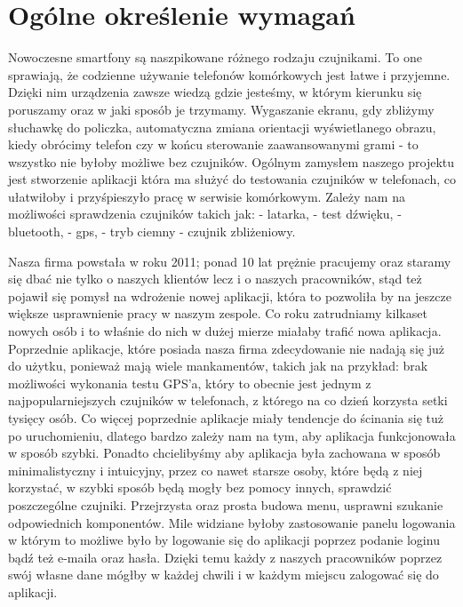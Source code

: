 \section{Ogólne określenie wymagań}		%

\hspace{0.60cm}Nowoczesne smartfony są naszpikowane różnego rodzaju czujnikami. To one sprawiają, że codzienne używanie telefonów komórkowych jest łatwe i przyjemne. Dzięki nim urządzenia zawsze wiedzą gdzie jesteśmy, w którym kierunku się poruszamy oraz w jaki sposób je trzymamy. Wygaszanie ekranu, gdy zbliżymy słuchawkę do policzka, automatyczna zmiana orientacji wyświetlanego obrazu, kiedy obrócimy telefon czy w końcu sterowanie zaawansowanymi grami - to wszystko nie byłoby możliwe bez czujników. Ogólnym zamysłem naszego projektu jest stworzenie aplikacji która ma służyć do testowania czujników w telefonach, co ułatwiłoby i przyśpieszyło pracę w serwisie komórkowym. Zależy nam na możliwości sprawdzenia czujników takich jak: 
- latarka, \newline 
- test dźwięku, \newline
- bluetooth, \newline
- gps, \newline
- tryb ciemny \newline
- czujnik zbliżeniowy.\newline

Nasza firma powstała w roku 2011; ponad 10 lat prężnie pracujemy oraz staramy się dbać nie tylko o naszych klientów lecz i o naszych pracowników, stąd też pojawił się pomysł na wdrożenie nowej aplikacji, która to pozwoliła by na jeszcze większe usprawnienie pracy w naszym zespole. Co roku zatrudniamy kilkaset nowych osób i to właśnie do nich w dużej mierze miałaby trafić nowa aplikacja. Poprzednie aplikacje, które posiada nasza firma zdecydowanie nie nadają się już do użytku, ponieważ mają wiele mankamentów, takich jak na przykład: brak możliwości wykonania testu GPS'a, który to obecnie jest jednym z najpopularniejszych czujników w telefonach, z którego na co dzień korzysta setki tysięcy osób. Co więcej poprzednie aplikacje miały tendencje do ścinania się tuż po uruchomieniu, dlatego bardzo zależy nam na tym, aby aplikacja funkcjonowała w sposób szybki. Ponadto chcielibyśmy aby aplikacja była zachowana w sposób minimalistyczny i intuicyjny, przez co nawet starsze osoby, które będą z niej korzystać, w szybki sposób będą mogły bez pomocy innych, sprawdzić poszczególne czujniki. Przejrzysta oraz prosta budowa menu, usprawni szukanie odpowiednich komponentów. Mile widziane byłoby zastosowanie panelu logowania w którym to możliwe było by logowanie się do aplikacji poprzez podanie loginu bądź też e-maila oraz hasła. Dzięki temu każdy z naszych pracowników poprzez swój własne dane mógłby w każdej chwili i w każdym miejscu zalogować się do aplikacji.\newline


